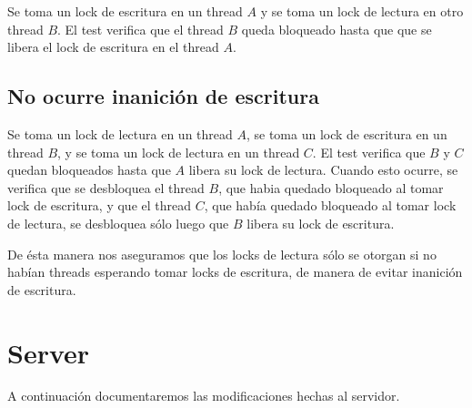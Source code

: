 \documentclass[a4paper,10pt,twoside]{article}
\begin{document}
Se toma un lock de escritura en un thread $A$ y se toma un lock de lectura en otro thread $B$. El test verifica que el thread $B$ queda bloqueado hasta que que se libera el lock de escritura en el thread $A$.


\subsection{No ocurre inanición de escritura}

Se toma un lock de lectura en un thread $A$, se toma un lock de escritura en un thread $B$, y se toma un lock de lectura en un thread $C$. El test verifica que $B$ y $C$ quedan bloqueados hasta que $A$ libera su lock de lectura. Cuando esto ocurre, se verifica que se desbloquea el thread $B$, que habia quedado bloqueado al tomar lock de escritura, y que el thread $C$, que había quedado bloqueado al tomar lock de lectura, se desbloquea sólo luego que $B$ libera su lock de escritura.

De ésta manera nos aseguramos que los locks de lectura sólo se otorgan si no habían threads esperando tomar locks de escritura, de manera de evitar inanición de escritura.







\section{Server}

A continuación documentaremos las modificaciones hechas al servidor.
\end{document}
